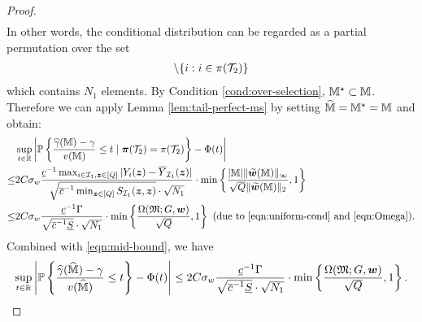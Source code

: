 \documentclass[12pt]{article}
\begin{document}
{\begin{proof}
\begin{align*}
\end{align*}
In other words, the conditional distribution can be regarded as a partial permutation over the set 
\begin{align*}
    [N]\backslash\{i:i\in \pi(\cT_2)\}
\end{align*}
which contains $N_1$ elements. 
By Condition \ref{cond:over-selection}, ${\mathbb{M}}^\star\subset {\mathbb{M}}$. Therefore we can apply Lemma \ref{lem:tail-perfect-ms} by setting $\widehat{{\mathbb{M}}} = {\mathbb{M}}^\star = {\mathbb{M}}$ and obtain:
\begin{align}
&\sup_{t\in\bbR}\lt|\Prob{\frac{\hgamma(\bbM) - \gamma}{v(\bbM)} \le t  \mid  \boldsymbol{\pi}(\cT_2) = \pi(\cT_2)} - \Phi(t)\rt|\notag\\ 
\le &
2C\sigma_w   \frac{\underline{c}^{-1} \max_{i\in\cI_1,\bz\in[Q]}|Y_i(\bz)-\overline{Y}_{\cI_1}(\bz)|}{\sqrt{\overline{c}^{-1} \min_{\bz\in[Q]} S_{\cI_1}(\bz,\bz)}\cdot \sqrt{N_1}}\cdot \min\lt\{\frac{|\bbM|\|\tilde{\bw}(\bbM)\|_\infty}{\sqrt{Q}\|\tilde{\bw}(\bbM)\|_2},1\rt\}\notag\\
\le & 
2C\sigma_w   \frac{\underline{c}^{-1} \Gamma}{\sqrt{\overline{c}^{-1} \underline{S}}\cdot \sqrt{N_1}}\cdot \min\lt\{\frac{\Omega(\mathfrak{M};G,\bw)}{\sqrt{Q} },1\rt\} \see{due to \eqref{eqn:uniform-cond} and \eqref{eqn:Omega}}.%
\end{align}
Combined with \eqref{eqn:mid-bound}, we have
\begin{align*}
    \sup_{t\in{\mathbb{R}}}\left|{{\mathbb{P}}\left\{\frac{{\widehat{\gamma}}(\widehat{{\mathbb{M}}}) - \gamma}{v(\widehat{{\mathbb{M}}})} \le t\right\}} - \Phi(t)\right| \le 2C\sigma_w   \frac{\underline{c}^{-1} \Gamma}{\sqrt{\overline{c}^{-1} \underline{S}}\cdot \sqrt{N_1}}\cdot \min\left\{\frac{\Omega(\mathfrak{M};G,{\boldsymbol{w}})}{\sqrt{Q} },1\right\}.
\end{align*}
\end{proof}
}
\end{document}
